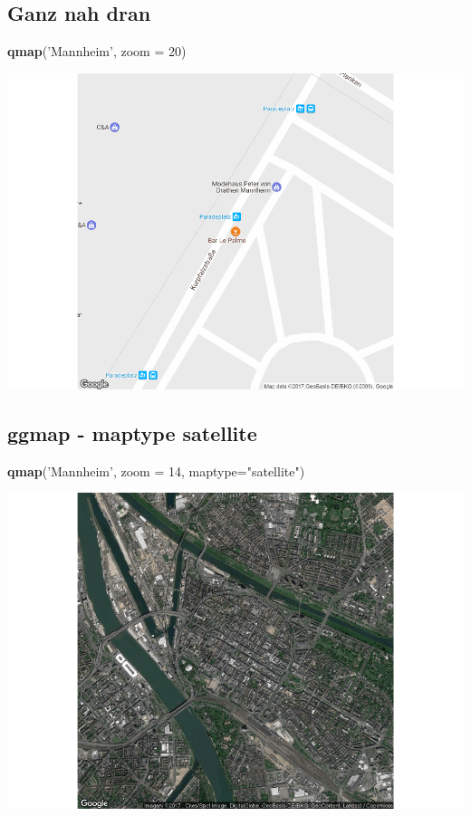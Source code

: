 \documentclass[]{article}
\newenvironment{Shaded}{\begin{snugshade}}{\end{snugshade}}
\newcommand{\KeywordTok}[1]{\textcolor[rgb]{0.13,0.29,0.53}{\textbf{{#1}}}}
\newcommand{\DataTypeTok}[1]{\textcolor[rgb]{0.13,0.29,0.53}{{#1}}}
\newcommand{\DecValTok}[1]{\textcolor[rgb]{0.00,0.00,0.81}{{#1}}}
\newcommand{\StringTok}[1]{\textcolor[rgb]{0.31,0.60,0.02}{{#1}}}
\newcommand{\NormalTok}[1]{{#1}}
\begin{document}
\subsection{Ganz nah dran}\label{ganz-nah-dran}

\begin{Shaded}
\begin{Highlighting}[]
\KeywordTok{qmap}\NormalTok{(}\StringTok{'Mannheim'}\NormalTok{, }\DataTypeTok{zoom =} \DecValTok{20}\NormalTok{)}
\end{Highlighting}
\end{Shaded}

\includegraphics{Intro_Datenanalyse1_files/figure-latex/unnamed-chunk-247-1.pdf}

\subsection{ggmap - maptype satellite}\label{ggmap---maptype-satellite}

\begin{Shaded}
\begin{Highlighting}[]
\KeywordTok{qmap}\NormalTok{(}\StringTok{'Mannheim'}\NormalTok{, }\DataTypeTok{zoom =} \DecValTok{14}\NormalTok{, }\DataTypeTok{maptype=}\StringTok{"satellite"}\NormalTok{)}
\end{Highlighting}
\end{Shaded}

\includegraphics{Intro_Datenanalyse1_files/figure-latex/unnamed-chunk-248-1.pdf}
\end{document}
